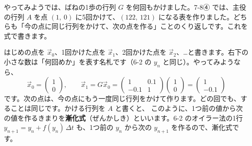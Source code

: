 \begin{omoidasou}
\end{omoidasou}




\leavevmode\label{bk:7-10:kurikaeshi}やってみようでは、ばねの1歩の行列 $G$ を何回もかけました。7-8④ では、主役の行列 $A$ を点 $(1,\ 0)$ に5回かけて、$(122,\ 121)$ になる表を作りました。どちらも「今の点に同じ行列をかけて、次の点を作る」ことのくり返しです。これを式で書きます。

はじめの点を $\vec x_0$、1回かけた点を $\vec x_1$、2回かけた点を $\vec x_2$、…と書きます。右下の小さな数は「何回めか」を表す名札です（6-2 の $y_n$ と同じ）。やってみようなら、
\[ \vec x_0=\begin{pmatrix}1\\0\end{pmatrix},\qquad \vec x_1=G\vec x_0=\begin{pmatrix}1&0.1\\-0.1&1\end{pmatrix}\begin{pmatrix}1\\0\end{pmatrix}=\begin{pmatrix}1\\-0.1\end{pmatrix} \]
です。次の点は、今の点にもう一度同じ行列をかけて作ります。どの回でも、することは同じです。かける行列を $A$ と書くと、
このように、1つ前の値から次の値を作るきまりを\textbf{漸化式}（ぜんかしき）といいます。6-2 のオイラー法の1行 $y_{n+1}=y_n+f(y_n)\,\Delta t$ も、1つ前の $y_n$ から次の $y_{n+1}$ を作るので、漸化式です。


